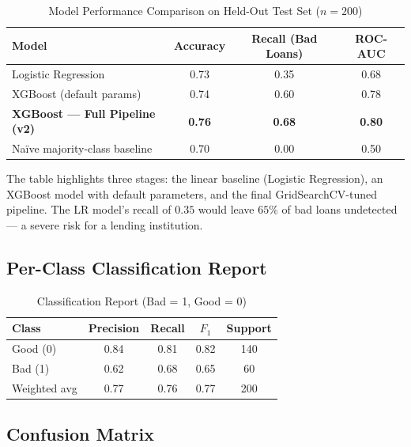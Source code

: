 \documentclass[12pt,a4paper]{article}
\theoremstyle{definition}
\begin{document}
\begin{table}[H]
  \centering
  \caption{Model Performance Comparison on Held-Out Test Set ($n=200$)}
  \label{tab:results}
  \begin{tabular}{lccc}
    \toprule
    \textbf{Model} & \textbf{Accuracy} & \textbf{Recall (Bad Loans)} & \textbf{ROC-AUC} \\
    \midrule
    Logistic Regression                  & 0.73 & 0.35 & 0.68 \\
    XGBoost (default params)             & 0.74 & 0.60 & 0.78 \\
    \midrule
    \rowcolor{primary!8}
    \textbf{XGBoost — Full Pipeline (v2)} & \textbf{0.76} & \textbf{0.68} & \textbf{0.80} \\
    \midrule
    Naïve majority-class baseline        & 0.70 & 0.00 & 0.50 \\
    \bottomrule
  \end{tabular}
\end{table}

\noindent
The table highlights three stages: the linear baseline (Logistic Regression),
an XGBoost model with default parameters, and the final GridSearchCV-tuned
pipeline.  The LR model's recall of $0.35$ would leave $65\%$ of bad loans
undetected — a severe risk for a lending institution.

\subsection{Per-Class Classification Report}

\begin{table}[H]
  \centering
  \caption{Classification Report (Bad = 1, Good = 0)}
  \label{tab:clf}
  \begin{tabular}{lcccc}
    \toprule
    \textbf{Class} & \textbf{Precision} & \textbf{Recall} & \textbf{$F_1$} & \textbf{Support} \\
    \midrule
    Good (0)     & 0.84 & 0.81 & 0.82 & 140 \\
    Bad  (1)     & 0.62 & 0.68 & 0.65 &  60 \\
    \midrule
    Weighted avg & 0.77 & 0.76 & 0.77 & 200 \\
    \bottomrule
  \end{tabular}
\end{table}

\subsection{Confusion Matrix}
\end{document}
